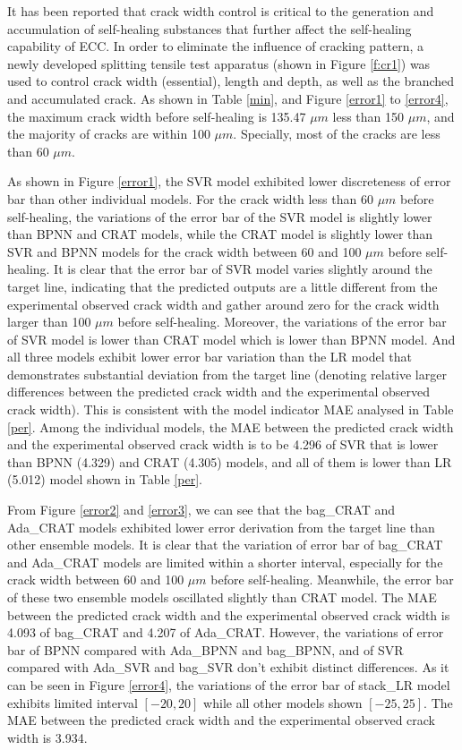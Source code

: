 \documentclass[11pt]{article}
\begin{document}
	It has been reported that crack width control is critical to the generation and accumulation of self-healing substances \cite{vidal2004analyzing,wang1997permeability,reinhardt2003permeability,edvardsen1999water,qiu2016coupled} that further affect the self-healing capability of ECC. In order to eliminate the influence of cracking pattern, a newly developed splitting tensile test apparatus (shown in Figure \ref{f:cr1}) was used to control crack width (essential), length and depth, as well as the branched and accumulated crack. As shown in Table \ref{min}, and Figure \ref{error1} to \ref{error4}, the maximum crack width before self-healing is 135.47 $\mu m$ less than 150 $\mu m$, and the majority of cracks are within 100 $\mu m$. Specially, most of the cracks are less than 60 $\mu m$. 

    As shown in Figure \ref{error1}, the SVR model exhibited lower discreteness of error bar than other individual models. For the crack width less than 60 $\mu m$ before self-healing, the variations of the error bar of the SVR model is slightly lower than BPNN and CRAT models, while the CRAT model is slightly lower than SVR and BPNN models for the crack width between 60 and 100 $\mu m$ before self-healing. It is clear that the error bar of SVR model varies slightly around the target line, indicating that the predicted outputs are a little different from the experimental observed crack width and gather around zero for the crack width larger than 100 $\mu m$ before self-healing. Moreover, the variations of the error bar of SVR model is lower than CRAT model which is lower than BPNN model. And all three models exhibit lower error bar variation than the LR model that demonstrates substantial deviation from the target line (denoting relative larger differences between the predicted crack width and the experimental observed crack width). This is consistent with the model indicator MAE analysed in Table \ref{per}. Among the individual models, the MAE between the predicted crack width and the experimental observed crack width is to be 4.296 of SVR that is lower than BPNN (4.329) and CRAT (4.305) models, and all of them is lower than LR (5.012) model shown in Table \ref{per}.
    
    	

	
    From Figure \ref{error2} and \ref{error3}, we can see that the bag\_CRAT and Ada\_CRAT models exhibited lower error derivation from the target line than other ensemble models. It is clear that the variation of error bar of bag\_CRAT and Ada\_CRAT models are limited within a shorter interval, especially for the crack width between 60 and 100 $\mu m$ before self-healing. Meanwhile, the error bar of these two ensemble models oscillated slightly than CRAT model. The MAE between the predicted crack width and the experimental observed crack width is 4.093 of bag\_CRAT and 4.207 of Ada\_CRAT. However, the variations of error bar of BPNN compared with Ada\_BPNN and bag\_BPNN, and of SVR compared with Ada\_SVR and bag\_SVR don't exhibit distinct differences. As it can be seen in Figure \ref{error4}, the variations of the error bar of stack\_LR model exhibits limited interval $[-20,20]$ while all other models shown $[-25,25]$. The MAE between the predicted crack width and the experimental observed crack width is 3.934. 
    
\end{document}
